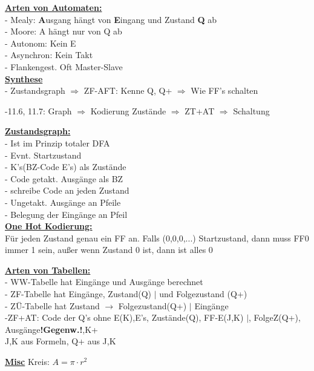 \documentclass[8pt]{extarticle}
\begin{document}
\begin{minipage}{0.33\textwidth}

\underline{\textbf{Arten von Automaten:}}\\
- Mealy: \textbf{A}usgang hängt von \textbf{E}ingang und Zustand \textbf{Q} ab \\
- Moore: A hängt nur von Q ab \\
- Autonom: Kein E \\
- Asynchron: Kein Takt \\
- Flankengest. Oft Master-Slave \\

\underline{\textbf{Synthese}}\\
- Zustandsgraph $\Rightarrow$ ZF-AFT: Kenne Q, Q+ $\Rightarrow$ Wie FF's schalten

-11.6, 11.7: Graph $\Rightarrow$ Kodierung Zustände $\Rightarrow$ ZT+AT $\Rightarrow$ Schaltung
\vspace{5cm}

\underline{\textbf{Zustandsgraph:}}\\
- Ist im Prinzip totaler DFA\\
- Evnt. Startzustand\\
- K's(BZ-Code E's) als Zustände\\
- Code getakt. Ausgänge als BZ\\
- schreibe Code an jeden Zustand\\
- Ungetakt. Ausgänge an Pfeile\\
- Belegung der Eingänge an Pfeil\\

\underline{\textbf{One Hot Kodierung:}}\\
Für jeden Zustand genau ein FF an. Falls (0,0,0,...) Startzustand, dann muss FF0 immer 1 sein, außer wenn Zustand 0 ist, dann ist alles 0
\end{minipage}%

\vspace*{-0.3 cm}
\underline{\textbf{Arten von Tabellen:}}\\
- WW-Tabelle hat Eingänge und Ausgänge berechnet\\
- ZF-Tabelle hat Eingänge, Zustand(Q) $|$ und Folgezustand (Q+)\\
- ZÜ-Tabelle hat Zustand $\rightarrow$ Folgezustand(Q+) $|$ Eingänge\\
-ZF+AT: Code der Q's ohne E(K),E's, Zustände(Q), FF-E(J,K) $|$, FolgeZ(Q+), Ausgänge\textbf{!Gegenw.!},K+\\
\phantom{ss} J,K aus Formeln, Q+ aus J,K


\underline{\textbf{Misc}}
Kreis: $A = \pi \cdot r^2$\\
\end{document}
